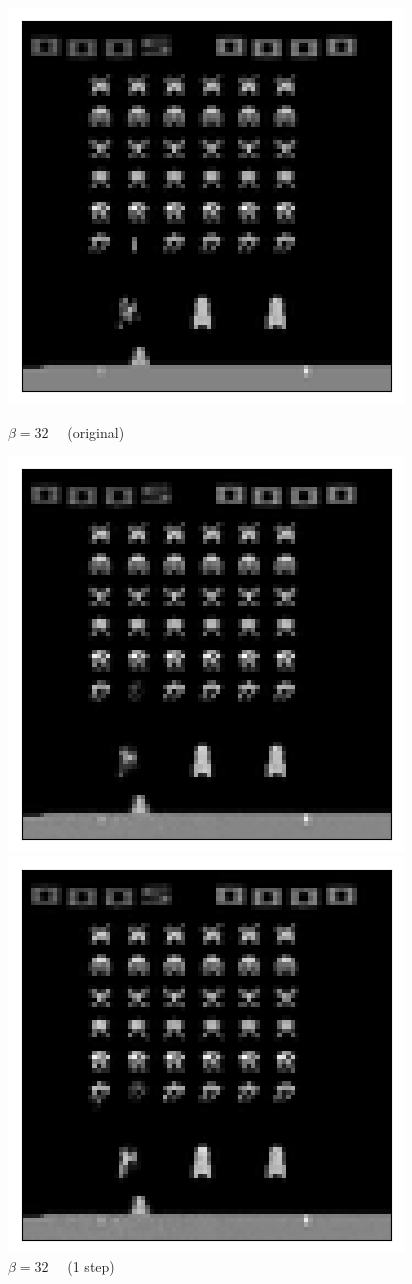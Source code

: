 \begin{figure}[h!]
\begin{multicols}{4}
    \includegraphics[scale=0.4]{figures/results/naive_average/beta_4_posterior_sample_original.png}
    \caption{$\beta=32\quad$ (original)}
    \includegraphics[scale=0.4]{figures/results/naive_average/beta_32_posterior_sample_0.png}
    \caption{$\beta=32\quad$ (1 step)}
    \includegraphics[scale=0.4]{figures/results/naive_average/beta_32_posterior_sample_5.png}

\end{multicols}
\end{figure}
